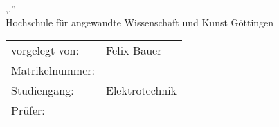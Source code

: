 \thispagestyle{plain}
\begin{titlepage}
	
	\begin{center}
		
		\begin{minipage}{0.5\textwidth}
			\centering
		\end{minipage}%
		\hfill%
		\begin{minipage}{0.5\textwidth}
			\centering
		\end{minipage}\\[6ex]
		
		\huge{\textsc{\textbf{\untertitel}}}\\[1.5ex]
		\LARGE{,,\titel''}\\[4ex]		

		\normalsize
		Hochschule für angewandte Wissenschaft und Kunst Göttingen
			
	
	\vfill
		\normalsize
		\begin{tabular}{w{5.4cm}p{10cm}}
			vorgelegt von:  & \quad Felix Bauer  \\
			Matrikelnummer:	 & \quad \matrikel	\\	 
			Studiengang:     & \quad Elektrotechnik \\   
			Prüfer:      & \quad \erstgutachter \\
		\end{tabular}
		\vfill
		
	\end{center}
	
\end{titlepage}
